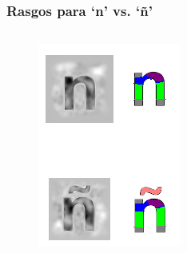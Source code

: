 \documentclass[10pt]{beamer}
\begin{document}
 	\begin{frame}
	\frametitle{Rasgos para `n' vs. `\~n'}
	  \begin{columns}[t]
	  \begin{figure}
	      \includegraphics[width=\textwidth]{graficos/rasgos_resultadosEnieHumano.png}
	  \end{figure}


\end{columns}
\end{frame}
\end{document}
